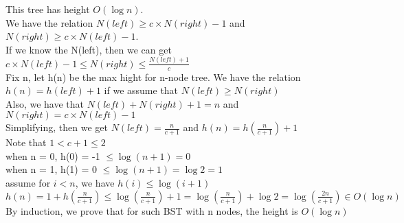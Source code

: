 \documentclass[12pt]{article}
\begin{document}
\begin{enumerate}
		This tree has height $O(\log n)$.\\
		We have the relation $N(left) \geq c\times N(right) - 1$ and $N(right) \geq c\times N(left) - 1$.\\
		If we know the N(left), then we can get $c\times N(left)-1 \leq N(right) \leq \frac{N(left)+1}{c}$\\
		Fix n, let h(n) be the max hight for n-node tree. We have the relation $h(n) = h(left) + 1$ if we assume that $N(left) \geq N(right)$\\
		Also, we have that $N(left) + N(right) + 1 = n$ and $N(right) = c\times N(left) -1$\\
		Simplifying, then we get $N(left)=\frac{n}{c+1}$ and $h(n) = h(\frac{n}{c+1})+1$\\
		Note that $1<c+1\leq 2$\\
		when n = 0, h(0) = -1 $\leq \log (n+1) = 0$\\
		when n = 1, h(1) = 0 $\leq \log (n+1) = \log 2 = 1$\\
		assume for $i < n$, we have $h(i) \leq \log (i+1)$\\
		$h(n) = 1 + h(\frac{n}{c+1}) \leq \log(\frac{n}{c+1}) + 1 = \log(\frac{n}{c+1}) + \log 2 = \log(\frac{2n}{c+1}) \in O(\log n)$\\
		By induction, we prove that for such BST with n nodes, the height is $O(\log n)$
	\end{enumerate}
	
	
	
	
	
\end{document}
